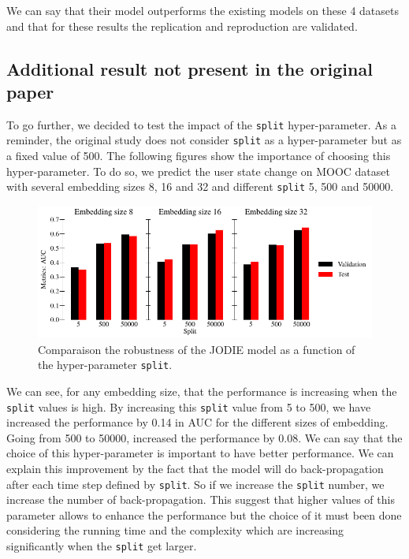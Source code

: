 We can say that their model outperforms the existing models on these 4 datasets and that for these results the replication and reproduction are validated.

\subsection*{Additional result not present in the original paper}

To go further, we decided to test the impact of the \texttt{split} hyper-parameter. As a reminder, the original study does not consider \texttt{split} as a hyper-parameter but as a fixed value of 500. The following figures show the importance of choosing this hyper-parameter. To do so, we predict the user state change on MOOC dataset with several embedding sizes 8, 16 and 32 and different \texttt{split} 5, 500 and 50000.

\begin{figure}[H]
    \centering
    \includegraphics[width = \textwidth]{image/split.pdf}
    \caption{Comparaison the robustness of the JODIE model as a function of the hyper-parameter \texttt{split}.}
    \label{split}
\end{figure}

We can see, for any embedding size, that the performance is increasing when the \texttt{split} values is high. By increasing this \texttt{split} value from 5 to 500, we have increased the performance by 0.14 in AUC for the different sizes of embedding. Going from 500 to 50000, increased the performance by 0.08. We can say that the choice of this hyper-parameter is important to have better performance. We can explain this improvement by the fact that the model will do back-propagation after each time step defined by \texttt{split}. So if we increase the \texttt{split} number, we increase the number of back-propagation. This suggest that higher values of this parameter allows to enhance the performance but the choice of it must been done considering the running time and the complexity which are increasing significantly when the \texttt{split} get larger.


